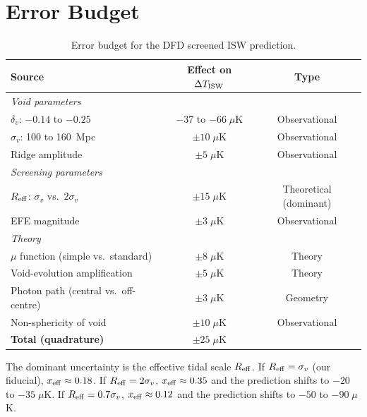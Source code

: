 \documentclass[11pt,a4paper]{article}
\newcommand{\mufd}{\mu}
\begin{document}
\section{Error Budget}
\label{sec:errors}

\begin{table}[H]
\centering
\caption{Error budget for the DFD screened ISW prediction.}
\label{tab:errors}
\begin{tabular}{lcc}
\toprule
\textbf{Source} & \textbf{Effect on $\Delta T_{\rm ISW}$} &
\textbf{Type} \\
\midrule
\multicolumn{3}{l}{\textit{Void parameters}} \\
$\delta_v$: $-0.14$ to $-0.25$ & $-37$ to $-66\;\mu$K & Observational \\
$\sigma_v$: 100 to 160~Mpc & $\pm 10\;\mu$K & Observational \\
Ridge amplitude & $\pm 5\;\mu$K & Observational \\
\midrule
\multicolumn{3}{l}{\textit{Screening parameters}} \\
$R_{\rm eff}$: $\sigma_v$ vs.\ $2\sigma_v$ & $\pm 15\;\mu$K &
  Theoretical (dominant) \\
EFE magnitude & $\pm 3\;\mu$K & Observational \\
\midrule
\multicolumn{3}{l}{\textit{Theory}} \\
$\mufd$ function (simple vs.\ standard) & $\pm 8\;\mu$K & Theory \\
Void-evolution amplification & $\pm 5\;\mu$K & Theory \\
Photon path (central vs.\ off-centre) & $\pm 3\;\mu$K & Geometry \\
Non-sphericity of void & $\pm 10\;\mu$K & Observational \\
\midrule
\textbf{Total (quadrature)} & $\pm 25\;\mu$K & \\
\bottomrule
\end{tabular}
\end{table}

The dominant uncertainty is the effective tidal scale $R_{\rm eff}$.
If $R_{\rm eff} = \sigma_v$ (our fiducial), $x_{\rm eff} \approx 0.18$.
If $R_{\rm eff} = 2\sigma_v$, $x_{\rm eff} \approx 0.35$ and the
prediction shifts to $-20$ to $-35\;\mu$K. If $R_{\rm eff} = 0.7\sigma_v$,
$x_{\rm eff} \approx 0.12$ and the prediction shifts to $-50$ to
$-90\;\mu$K.
\end{document}
